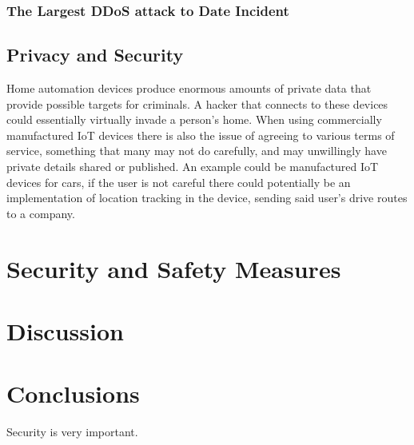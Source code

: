 \documentclass[a4paper, conference]{IEEEtran/IEEEtran}
\begin{document}
\subsubsection{The Largest DDoS attack to Date Incident}

\subsection{Privacy and Security}
Home automation devices produce enormous amounts of private data that provide possible targets for criminals. A hacker that connects to these devices could essentially virtually invade a person's home. When using commercially manufactured IoT devices there is also the issue of agreeing to various terms of service, something that many may not do carefully, and may unwillingly have private details shared or published. An example could be manufactured IoT devices for cars, if the user is not careful there could potentially be an implementation of location tracking in the device, sending said user's drive routes to a company.\cite{meola}

\section{Security and Safety Measures}

\section{Discussion}

\section{Conclusions}
Security is very important.


\end{document}
